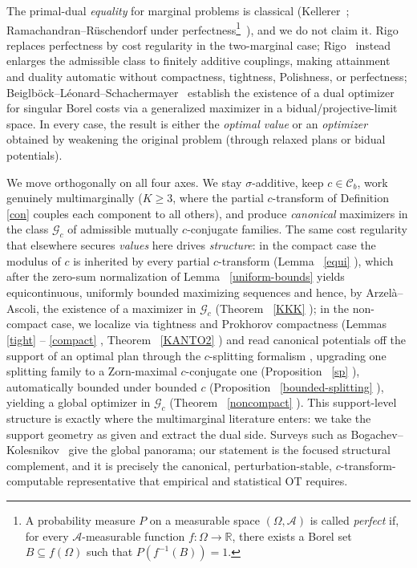 \documentclass[twoside,11pt,a4paper]{article}
\newcommand*{\SavedRef}{}
\let\SavedRef\ref
\renewcommand*{\ref}[1]{  \begingroup
    \hypersetup{
      linkcolor=linkequation,
      linkbordercolor=linkequation,
    }    \SavedRef{#1}  \endgroup
}
\begin{document}
The primal-dual \emph{equality} for marginal problems is classical
(Kellerer~\cite{kellerer}; Ramachandran--R\"uschendorf under
perfectness\footnote{A probability measure $P$ on a measurable space
$(\Omega,\mathcal A)$ is called \emph{perfect} if, for every
$\mathcal A$-measurable function $f:\Omega\to\mathbb R$, there exists a Borel set
$B\subseteq f(\Omega)$ such that $P(f^{-1}(B))=1$.}~\cite{Ramachandran}), and we do not claim it. Rigo~\cite{Rigo} replaces perfectness
by cost regularity in the two-marginal case; Rigo~\cite{Rigo2} instead
enlarges the admissible class to finitely additive couplings, making attainment
and duality automatic without compactness, tightness, Polishness, or perfectness;
Beiglb\"ock--L\'eonard--Schachermayer~\cite{Beiglb} establish the existence of a dual optimizer for
singular Borel costs via a generalized maximizer in a bidual/projective-limit
space. In every case, the result is either the \emph{optimal value} or an \emph{optimizer} obtained by weakening the original problem (through relaxed plans or bidual potentials).


We move orthogonally on all four axes. We stay $\sigma$-additive, keep
$c\in\mathcal C_b$, work genuinely multimarginally ($K\ge3$, where the partial
$c$-transform of Definition~\ref{con} couples each component to all others), and
produce \emph{canonical} maximizers in the class $\mathcal G_c$ of admissible
mutually $c$-conjugate families. The same cost regularity that elsewhere secures
\emph{values} here drives \emph{structure}: in the compact case the modulus of
$c$ is inherited by every partial $c$-transform (Lemma~\ref{equi}), which after
the zero-sum normalization of Lemma~\ref{uniform-bounds} yields equicontinuous,
uniformly bounded maximizing sequences and hence, by Arzelà--Ascoli, the existence of a maximizer in $\mathcal G_c$ (Theorem~\ref{KKK}); in the non-compact case, we localize via
tightness and Prokhorov compactness (Lemmas~\ref{tight}--\ref{compact},
Theorem~\ref{KANTO2}) and read canonical potentials off the support of an optimal
plan through the $c$-splitting formalism \cite{griessler2016}, upgrading one
splitting family to a Zorn-maximal $c$-conjugate one (Proposition~\ref{sp}),
automatically bounded under bounded $c$ (Proposition~\ref{bounded-splitting}),
yielding a global optimizer in $\mathcal G_c$ (Theorem~\ref{noncompact}). This
support-level structure is exactly where the multimarginal literature
\cite{gangbo1998,pass2012,pass2015,pass2022,colombo2015} enters: we take the
support geometry as given and extract the dual side. Surveys such as
Bogachev--Kolesnikov~\cite{Bogachev} give the global panorama; our statement is
the focused structural complement, and it is precisely the canonical,
perturbation-stable, $c$-transform-computable representative that empirical and
statistical OT \cite{del2019,tameling2019,fournier2015,peyre2019} requires.
\end{document}

